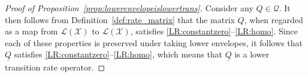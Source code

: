 \documentclass[10pt,a4paper]{paper}
\theoremstyle{definition}
\newtheorem{lemma}[theorem]{Lemma}
\newcommand{\states}{\mathcal{X}}
\newcommand{\gambles}{\mathcal{L}}
\newcommand{\gamblesX}{\gambles(\states)}
\newcommand{\rateset}{\mathcal{Q}}
\newcommand{\lrate}{\underline{Q}}
\newcommand{\norm}[1]{\left\lVert #1 \right\rVert}
\newcommand{\coloneqq}{:\!=}
\begin{document}

\begin{proof}[Proof of Proposition~\ref{prop:lowerenvelopeislowertrans}]
Consider any $Q\in\rateset$. It then follows from Definition~\ref{def:rate_matrix} that the matrix $Q$, when regarded as a map from $\gamblesX$ to $\gamblesX$, satisfies \ref{LR:constantzero}--\ref{LR:homo}. Since each of these properties is preserved under taking lower envelopes, it follows that $\lrate$ satisfies \ref{LR:constantzero}--\ref{LR:homo}, which means that $\lrate$ is a lower transition rate operator.
\end{proof}
\end{document}
